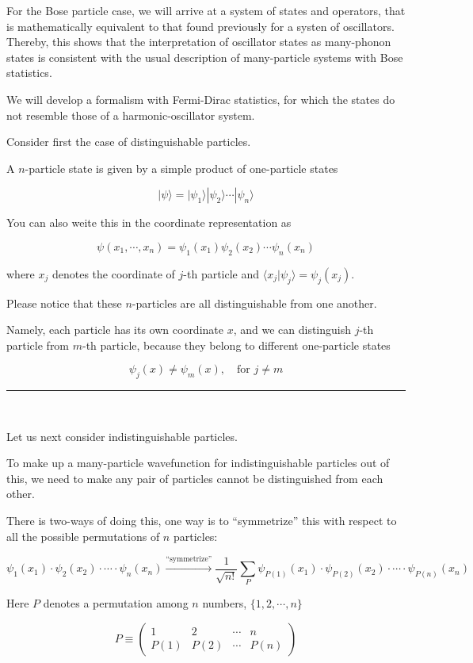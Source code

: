 ﻿\documentclass[twoside]{book}
\numberwithin{equation}{section}
\begin{document}
For the Bose particle case, we will arrive at a system of states and operators, that is mathematically equivalent to that found previously for a systen of oscillators. Thereby, this shows that the interpretation of oscillator states as many-phonon states is consistent with the usual description of many-particle systems with Bose statistics. 

We will develop a formalism with Fermi-Dirac statistics, for which the states do not resemble those of a harmonic-oscillator system. 

Consider first the case of distinguishable particles. 

A $n$-particle state is given by a simple product of one-particle states

\[|\psi\rangle = |\psi_1\rangle|\psi_2\rangle\cdots|\psi_n\rangle \]

You can also weite this in the coordinate representation as 

\[\psi(x_1,\cdots,x_n) = \psi_1(x_1)\psi_2(x_2)\cdots\psi_n(x_n) \]

where $x_j$ denotes the coordinate of $j$-th particle and $\langle x_j|\psi_j\rangle = \psi_j(x_j)$. 

Please notice that these $n$-particles are all distinguishable from one another. 

Namely, each particle has its own coordinate $x$, and we can distinguish $j$-th particle from $m$-th particle, because they belong to different one-particle states

\[\psi_j(x) \neq \psi_m(x),\quad \text{for }j\neq m \]

\hrule

\ 

Let us next consider indistinguishable particles. 

To make up a many-particle wavefunction for indistinguishable particles out of this, we need to make any pair of particles cannot be distinguished from each other. 

There is two-ways of doing this, one way is to ``symmetrize'' this with respect to all the possible permutations of $n$ particles:

\[\psi_1(x_1)\cdot\psi_2(x_2)\cdot\cdots\cdot\psi_n(x_n)\overset{\text{``symmetrize''}}{\longrightarrow}\frac{1}{\sqrt{n!}}\sum_P \psi_{P(1)}(x_1)\cdot\psi_{P(2)}(x_2)\cdot\cdots\cdot\psi_{P(n)}(x_n) \]

Here $P$ denotes a permutation among $n$ numbers, $\{1,2,\cdots,n\}$

\[P \equiv\left(
\begin{matrix}
1 & 2 & \cdots & n\\
P(1) & P(2) & \cdots & P(n)
\end{matrix}
\right) \]
\end{document}
